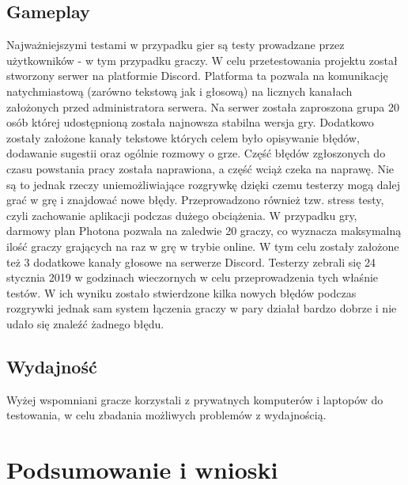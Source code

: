 \documentclass[a4paper,12pt,twoside,openany]{report}
\begin{document}

\section{Gameplay}

Najważniejszymi testami w przypadku gier są testy prowadzane przez użytkowników - w tym przypadku graczy. W celu przetestowania projektu został stworzony serwer na platformie Discord. Platforma ta pozwala na komunikację natychmiastową (zarówno tekstową jak i głosową) na licznych kanałach założonych przed administratora serwera. Na serwer została zaproszona grupa 20 osób której udostępnioną została najnowsza stabilna wersja gry. Dodatkowo zostały założone kanały tekstowe których celem było opisywanie błędów, dodawanie sugestii oraz ogólnie rozmowy o grze. Część błędów zgłoszonych do czasu powstania pracy została naprawiona, a część wciąż czeka na naprawę. Nie są to jednak rzeczy uniemożliwiające rozgrywkę dzięki czemu testerzy mogą dalej grać w grę i znajdować nowe błędy. Przeprowadzono również tzw. stress testy, czyli zachowanie aplikacji podczas dużego obciążenia. W przypadku gry, darmowy plan Photona pozwala na zaledwie 20 graczy, co wyznacza maksymalną ilość graczy grających na raz w grę w trybie online. W tym celu zostały założone też 3 dodatkowe kanały głosowe na serwerze Discord. Testerzy zebrali się 24 stycznia 2019 w godzinach wieczornych w celu przeprowadzenia tych właśnie testów. W ich wyniku zostało stwierdzone kilka nowych błędów podczas rozgrywki jednak sam system łączenia graczy w pary działał bardzo dobrze i nie udało się znaleźć żadnego błędu.

\section{Wydajność}
Wyżej wspomniani gracze korzystali z prywatnych komputerów i laptopów do testowania, w celu zbadania możliwych problemów z wydajnością. 

\chapter{Podsumowanie i wnioski }

\end{document}
